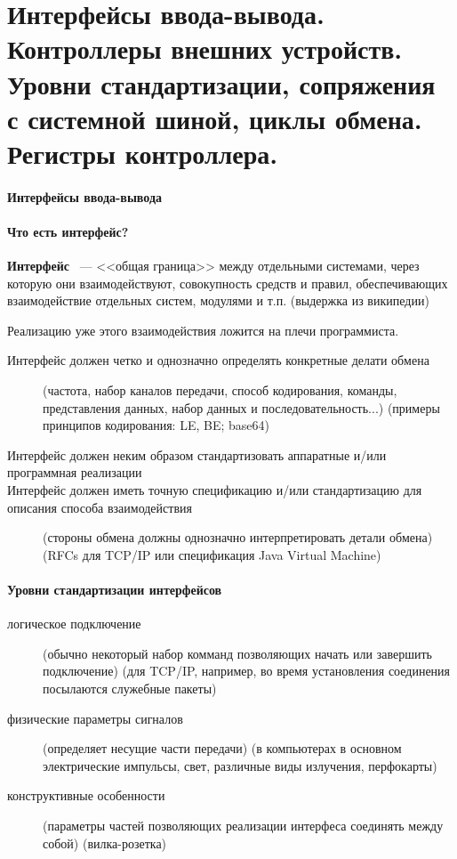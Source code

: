 \documentclass[10pt]{article}
\begin{document}
	\section{Интерфейсы ввода-вывода. Контроллеры внешних устройств. Уровни стандартизации, сопряжения с системной шиной, циклы обмена. Регистры контроллера.}
	\paragraph{Интерфейсы ввода-вывода}
	\paragraph{Что есть интерфейс?}
	\textbf{Интерфейс} ~--- <<общая граница>> между отдельными системами, через которую они взаимодействуют, совокупность средств и правил, обеспечивающих взаимодействие отдельных систем, модулями и т.п. (выдержка из википедии)

	Реализацию уже этого взаимодействия ложится на плечи программиста.
	\begin{description}
		\item[Интерфейс должен четко и однозначно определять конкретные делати обмена] (частота, набор каналов передачи, способ кодирования, команды, представления данных, набор данных и последовательность...) (примеры принципов кодирования: LE, BE; base64)
		\item[Интерфейс должен неким образом стандартизовать аппаратные и/или программная реализации]
		\item[Интерфейс должен иметь точную спецификацию и/или стандартизацию для описания способа взаимодействия] (стороны обмена должны однозначно интерпретировать детали обмена) (RFCs для TCP/IP или спецификация Java Virtual Machine)
	\end{description}
	\paragraph{Уровни стандартизации интерфейсов}
	\begin{description}
		\item[логическое подключение] (обычно некоторый набор комманд позволяющих начать или завершить подключение) (для TCP/IP, например, во время установления соединения посылаются служебные пакеты)
		\item[физические параметры сигналов] (определяет несущие части передачи) (в компьютерах в основном электрические импульсы, свет, различные виды излучения, перфокарты)
		\item[конструктивные особенности] (параметры частей позволяющих реализации интерфеса соединять между собой) (вилка-розетка)
	\end{description}
\end{document}
